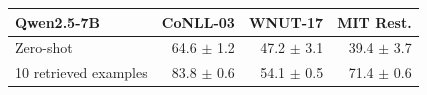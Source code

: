 \begingroup\small\setlength{\tabcolsep}{3pt}
\begin{tabular*}{\linewidth}{@{\extracolsep{\fill}}lrrr@{}}
\toprule
Qwen2.5-7B & CoNLL-03 & WNUT-17 & MIT Rest. \\
\midrule
Zero-shot & 64.6 $\pm$ 1.2 & 47.2 $\pm$ 3.1 & 39.4 $\pm$ 3.7 \\
10 retrieved examples & 83.8 $\pm$ 0.6 & 54.1 $\pm$ 0.5 & 71.4 $\pm$ 0.6 \\
\bottomrule
\end{tabular*}
\endgroup

